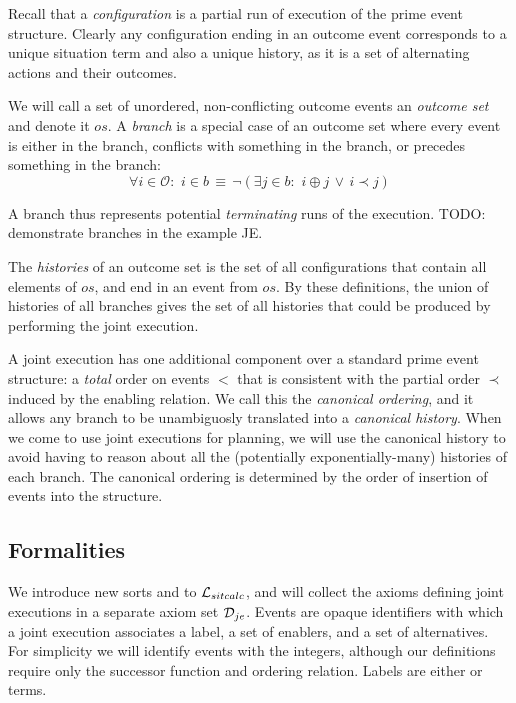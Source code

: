 Recall that a \emph{configuration} is a partial run of execution of
the prime event structure. Clearly any configuration ending in an
outcome event corresponds to a unique situation term and also a unique
history, as it is a set of alternating actions and their outcomes.

We will call a set of unordered, non-conflicting outcome events an
\emph{outcome set} and denote it $os$. A \emph{branch} is a special
case of an outcome set where every event is either in the branch,
conflicts with something in the branch, or precedes something in the
branch: \[
\forall i\in\mathcal{O}:\,\, i\in b\,\equiv\,\neg(\exists j\in b:\,\, i\oplus j\,\vee\, i\prec j)\]


A branch thus represents potential \emph{terminating} runs of the
execution. TODO: demonstrate branches in the example JE.

The \emph{histories} of an outcome set is the set of all configurations
that contain all elements of $os$, and end in an event from $os$.
By these definitions, the union of histories of all branches gives
the set of all histories that could be produced by performing the
joint execution.

A joint execution has one additional component over a standard prime
event structure: a \emph{total} order on events $<$ that is consistent
with the partial order $\prec$ induced by the enabling relation.
We call this the \emph{canonical ordering}, and it allows any branch
to be unambiguosly translated into a \emph{canonical history}. When
we come to use joint executions for planning, we will use the canonical
history to avoid having to reason about all the (potentially exponentially-many)
histories of each branch. The canonical ordering is determined by
the order of insertion of events into the structure.


\subsection{Formalities}

We introduce new sorts and  to $\mathcal{L}_{sitcalc}$,
and will collect the axioms defining joint executions in a separate
axiom set $\mathcal{D}_{je}$. Events are opaque identifiers with which a
joint execution associates a label, a set of enablers, and a set of
alternatives. For simplicity we will identify events with the integers,
although our definitions require only the successor function and ordering
relation. Labels are either  or  terms.


